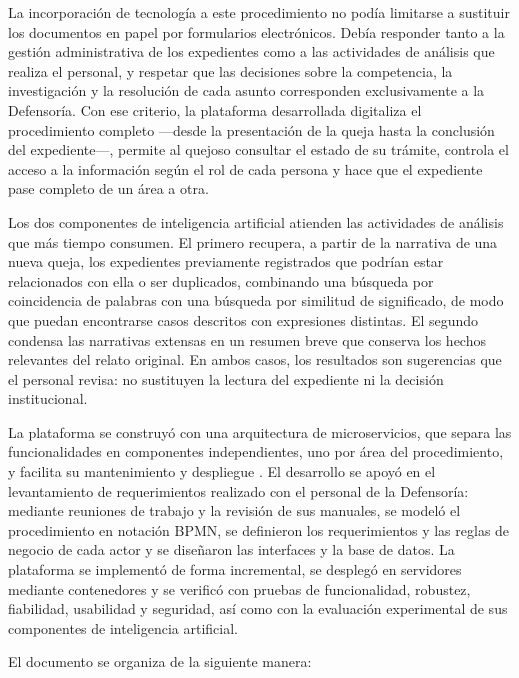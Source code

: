 La incorporación de tecnología a este procedimiento no podía limitarse a sustituir los documentos en papel por formularios electrónicos. Debía responder tanto a la gestión administrativa de los expedientes como a las actividades de análisis que realiza el personal, y respetar que las decisiones sobre la competencia, la investigación y la resolución de cada asunto corresponden exclusivamente a la Defensoría. Con ese criterio, la plataforma desarrollada digitaliza el procedimiento completo ---desde la presentación de la queja hasta la conclusión del expediente---, permite al quejoso consultar el estado de su trámite, controla el acceso a la información según el rol de cada persona y hace que el expediente pase completo de un área a otra.

Los dos componentes de inteligencia artificial atienden las actividades de análisis que más tiempo consumen. El primero recupera, a partir de la narrativa de una nueva queja, los expedientes previamente registrados que podrían estar relacionados con ella o ser duplicados, combinando una búsqueda por coincidencia de palabras con una búsqueda por similitud de significado, de modo que puedan encontrarse casos descritos con expresiones distintas. El segundo condensa las narrativas extensas en un resumen breve que conserva los hechos relevantes del relato original. En ambos casos, los resultados son sugerencias que el personal revisa: no sustituyen la lectura del expediente ni la decisión institucional.

La plataforma se construyó con una arquitectura de microservicios, que separa las funcionalidades en componentes independientes, uno por área del procedimiento, y facilita su mantenimiento y despliegue \cite{aws_microservicios, villamizar_microservices}. El desarrollo se apoyó en el levantamiento de requerimientos realizado con el personal de la Defensoría: mediante reuniones de trabajo y la revisión de sus manuales, se modeló el procedimiento en notación BPMN, se definieron los requerimientos y las reglas de negocio de cada actor y se diseñaron las interfaces y la base de datos. La plataforma se implementó de forma incremental, se desplegó en servidores mediante contenedores y se verificó con pruebas de funcionalidad, robustez, fiabilidad, usabilidad y seguridad, así como con la evaluación experimental de sus componentes de inteligencia artificial.

El documento se organiza de la siguiente manera:

